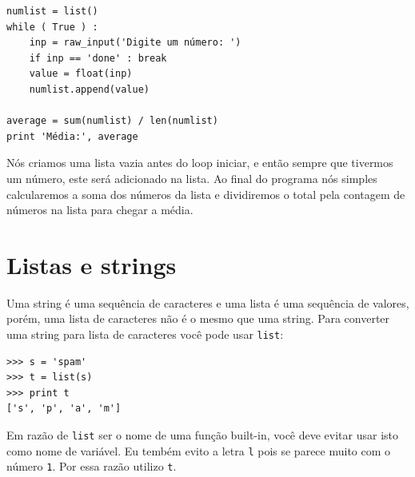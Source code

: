 

\beforeverb
\begin{verbatim}
numlist = list()
while ( True ) :
    inp = raw_input('Digite um número: ')
    if inp == 'done' : break
    value = float(inp)
    numlist.append(value)

average = sum(numlist) / len(numlist)
print 'Média:', average
\end{verbatim}
\afterverb
%
Nós criamos uma lista vazia antes do loop iniciar, e então sempre que tivermos
um número, este será adicionado na lista. Ao final do programa nós simples calcularemos
a soma dos números da lista e dividiremos o total pela contagem de números na lista para chegar
a média.


\section{Listas e strings}


Uma string é uma sequência de caracteres e uma lista é uma sequência de valores,
porém, uma lista de caracteres não é o mesmo que uma string. Para converter uma
string para lista de caracteres você pode usar {\tt list}:



\beforeverb
\begin{verbatim}
>>> s = 'spam'
>>> t = list(s)
>>> print t
['s', 'p', 'a', 'm']
\end{verbatim}
\afterverb
%
Em razão de {\tt list} ser o nome de uma função built-in, você deve evitar
usar isto como nome de variável. Eu tembém evito a letra {\tt l} pois se parece muito
com o número {\tt 1}. Por essa razão utilizo {\tt t}.

